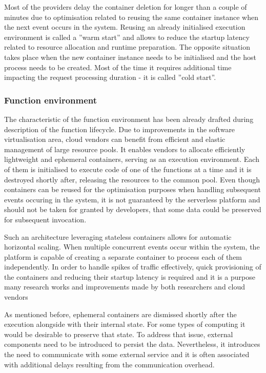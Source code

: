 
Most of the providers delay the container deletion for longer than a couple of minutes due to optimisation related to reusing the same container instance when the next event occurs in the system. Reusing an already initialised execution environment is called a ''warm start'' and allows to reduce the startup latency related to resource allocation and runtime preparation. The opposite situation takes place when the new container instance needs to be initialised and the host process needs to be created. Most of the time it requires additional time impacting the request processing duration - it is called ''cold start''.

\subsubsection*{Function environment}

The characteristic of the function environment has been already drafted during description of the function lifecycle. Due to improvements in the software virtualisation area, cloud vendors can benefit from efficient and elastic management of large resource pools. It enables vendors to allocate efficiently lightweight and ephemeral containers, serving as an execution environment. Each of them is initialised to execute code of one of the functions at a time and it is destroyed shortly after, releasing the resources to the common pool. Even though containers can be reused for the optimisation purposes when handling subsequent events occuring in the system, it is not guaranteed by the serverless platform and should not be taken for granted by developers, that some data could be preserved for subsequent invocation.

Such an architecture leveraging stateless containers allows for automatic horizontal scaling. When multiple concurrent events occur within the system, the platform is capable of creating a separate container to process each of them independently. In order to handle spikes of traffic effectively, quick provisioning of the containers and reducing their startup latency is required and it is a purpose many research works and improvements made by both researchers and cloud vendors

As mentioned before, ephemeral containers are dismissed shortly after the execution alongside with their internal state. For some types of computing it would be desirable to preserve that state. To address that issue, external components need to be introduced to persist the data. Nevertheless, it introduces the need to communicate with some external service and it is often associated with additional delays resulting from the communication overhead.

